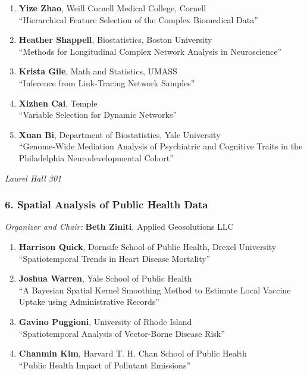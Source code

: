 \begin{enumerate}
\item \textbf{Yize Zhao}, Weill Cornell Medical College, Cornell \\
``Hierarchical Feature Selection of the Complex Biomedical Data''
\item \textbf{Heather Shappell}, Biostatistics, Boston University \\
``Methods for Longitudinal Complex Network Analysis in Neuroscience''
\item \textbf{Krista Gile}, Math and Statistics, UMASS \\
``Inference from Link-Tracing Network Samples''
\item \textbf{Xizhen Cai}, Temple \\
``Variable Selection for Dynamic Networks''
\item \textbf{Xuan Bi}, Department of Biostatistics, Yale University \\
``Genome-Wide Mediation Analysis of Psychiatric and Cognitive Traits in the Philadelphia Neurodevelopmental Cohort''
\end{enumerate}

\emph{Laurel Hall 301} \\[.5em]

\subsubsection*{6. Spatial Analysis of Public Health Data}

\emph{Organizer and Chair:} \textbf{Beth Ziniti}, Applied Geosolutions LLC

\begin{enumerate}
\item \textbf{Harrison Quick}, Dornsife School of Public Health, Drexel University \\
``Spatiotemporal Trends in Heart Disease Mortality''
\item \textbf{Joshua Warren}, Yale School of Public Health \\
``A Bayesian Spatial Kernel Smoothing Method to Estimate Local Vaccine Uptake using Administrative Records''
\item \textbf{Gavino Puggioni}, University of Rhode Island \\
``Spatiotemporal Analysis of Vector-Borne Disease Risk''
\item \textbf{Chanmin Kim}, Harvard T. H. Chan School of Public Health \\
``Public Health Impact of Pollutant Emissions''
\end{enumerate}

